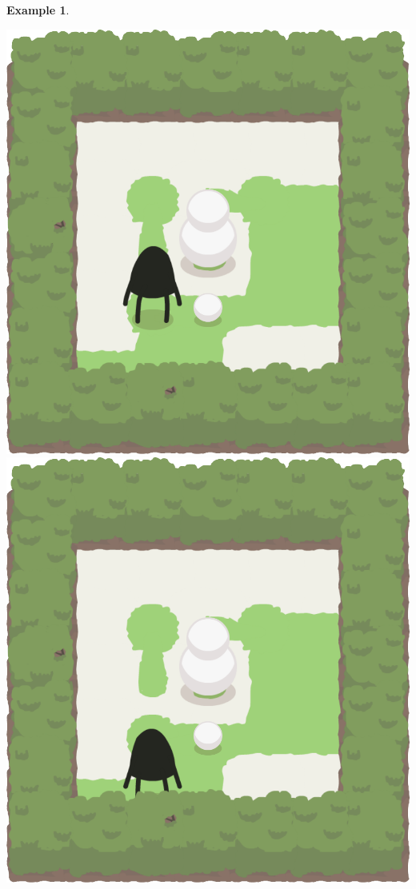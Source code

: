 \documentclass{report}
\theoremstyle{plain}
\newtheorem{example}{Example}[section]
\begin{document}
\begin{example}
\begin{center}
\includegraphics[width=\andyWidth\textwidth]{andy-basic-17.png} \quad
\includegraphics[width=\andyWidth\textwidth]{andy-basic-18.png} \quad

\end{center}
\end{example}
\end{document}
